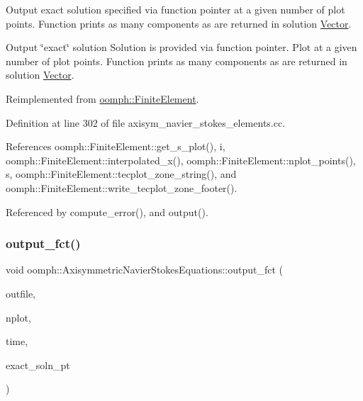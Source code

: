 Output exact solution specified via function pointer at a given number of plot points. Function prints as many components as are returned in solution \hyperlink{classoomph_1_1Vector}{Vector}. 

Output \char`\"{}exact\char`\"{} solution Solution is provided via function pointer. Plot at a given number of plot points. Function prints as many components as are returned in solution \hyperlink{classoomph_1_1Vector}{Vector}. 

Reimplemented from \hyperlink{classoomph_1_1FiniteElement_a22b695c714f60ee6cd145be348042035}{oomph\+::\+Finite\+Element}.



Definition at line 302 of file axisym\+\_\+navier\+\_\+stokes\+\_\+elements.\+cc.



References oomph\+::\+Finite\+Element\+::get\+\_\+s\+\_\+plot(), i, oomph\+::\+Finite\+Element\+::interpolated\+\_\+x(), oomph\+::\+Finite\+Element\+::nplot\+\_\+points(), s, oomph\+::\+Finite\+Element\+::tecplot\+\_\+zone\+\_\+string(), and oomph\+::\+Finite\+Element\+::write\+\_\+tecplot\+\_\+zone\+\_\+footer().



Referenced by compute\+\_\+error(), and output().

\mbox{\label{classoomph_1_1AxisymmetricNavierStokesEquations_a4a706a0922fc624f337fc5e5376002ae}} 
\subsubsection{\texorpdfstring{output\+\_\+fct()}{output\_fct()}\hspace{0.1cm}{\footnotesize\ttfamily [2/2]}}
{\footnotesize\ttfamily void oomph\+::\+Axisymmetric\+Navier\+Stokes\+Equations\+::output\+\_\+fct (\begin{DoxyParamCaption}\item[{std\+::ostream \&}]{outfile,  }\item[{const unsigned \&}]{nplot,  }\item[{const double \&}]{time,  }\item[{\hyperlink{classoomph_1_1FiniteElement_ad4ecf2b61b158a4b4d351a60d23c633e}{Finite\+Element\+::\+Unsteady\+Exact\+Solution\+Fct\+Pt}}]{exact\+\_\+soln\+\_\+pt }\end{DoxyParamCaption})\hspace{0.3cm}{\ttfamily [virtual]}}




